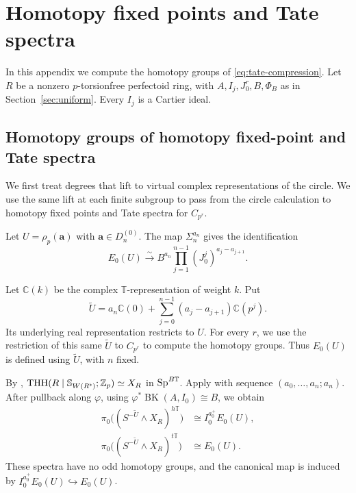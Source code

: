 \section{Homotopy fixed points and Tate spectra}
\label{app:spectral-foundations}

In this appendix we compute the homotopy groups
of \eqref{eq:tate-compression}.
Let $R$ be a nonzero $p$-torsionfree perfectoid ring, with
$A,I_j,J_0^r,B,\Phi_B$ as in Section~\ref{sec:uniform}.
Every $I_j$ is a Cartier ideal.

\subsection{Homotopy groups of homotopy fixed-point and Tate spectra}

We first treat degrees that lift to virtual complex representations of
the circle. We use the same lift at each finite subgroup to pass from
the circle calculation to homotopy fixed points and Tate spectra for $C_{p^r}$.

\begin{definition}\label{def:app-local-spectra}
Let $U=\rho_p(\mathbf a)$ with $\mathbf a\in D_n^{(0)}$. The map
$\Sigma_n^{a_n}$ gives the identification
\[
E_0(U)\xrightarrow{\sim}B^{a_n}
        \prod_{j=1}^{n-1}(J_0^j)^{a_j-a_{j+1}}.
\]

Let $\mathbb C(k)$ be the complex $\mathbb T$-representation
of weight $k$. Put
\[
\widetilde U
=a_n\mathbb C(0)
+\sum_{j=0}^{n-1}(a_j-a_{j+1})\mathbb C(p^j).
\]
Its underlying real representation restricts to $U$.
For every $r$, we use the restriction of this same
$\widetilde U$ to $C_{p^r}$ to compute the homotopy groups.
Thus $E_0(U)$ is defined using $\widetilde U$, with $n$ fixed.

\end{definition}

By \cite[Section~2, p.~12]{SulymaNew},
$\operatorname{THH}(R\mid\mathbb S_{W(R^\flat)};\mathbb Z_p)\simeq X_R$
in $\operatorname{Sp}^{B\mathbb T}$.
Apply \cite[Theorem~1.9 and Remarks~3.1,~3.5]{SulymaNew}
with sequence $(a_0,\ldots,a_n;a_n)$.
After pullback along $\varphi$, using
$\varphi^*\operatorname{BK}(A,I_0)\cong B$, we obtain
\[
\begin{aligned}
\pi_0\bigl((S^{-\widetilde U}\wedge X_R)^{h\mathbb T}\bigr)
&\cong I_0^{a_0^+}E_0(U),\\
\pi_0\bigl((S^{-\widetilde U}\wedge X_R)^{t\mathbb T}\bigr)
&\cong E_0(U).
\end{aligned}
\]
These spectra have no odd homotopy groups, and the canonical map
is induced by $I_0^{a_0^+}E_0(U)\hookrightarrow E_0(U)$.

